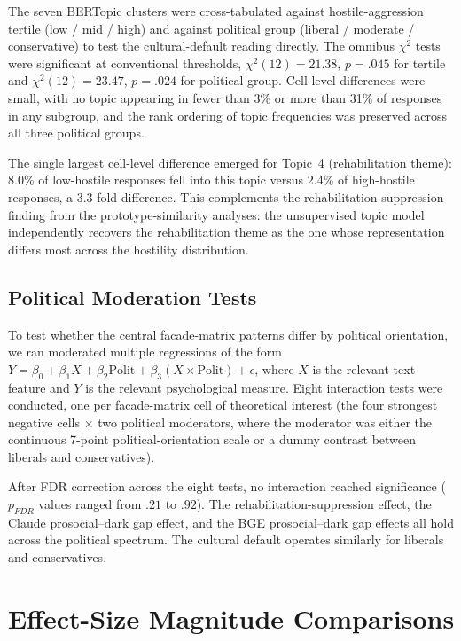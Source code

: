 The seven BERTopic clusters were cross-tabulated against hostile-aggression tertile (low / mid / high) and against political group (liberal / moderate / conservative) to test the cultural-default reading directly. The omnibus $\chi^2$ tests were significant at conventional thresholds, $\chi^2(12) = 21.38$, $p = .045$ for tertile and $\chi^2(12) = 23.47$, $p = .024$ for political group. Cell-level differences were small, with no topic appearing in fewer than 3\% or more than 31\% of responses in any subgroup, and the rank ordering of topic frequencies was preserved across all three political groups.

The single largest cell-level difference emerged for Topic~4 (rehabilitation theme): 8.0\% of low-hostile responses fell into this topic versus 2.4\% of high-hostile responses, a 3.3-fold difference. This complements the rehabilitation-suppression finding from the prototype-similarity analyses: the unsupervised topic model independently recovers the rehabilitation theme as the one whose representation differs most across the hostility distribution.

\subsection{Political Moderation Tests}
\label{sec:supp_political_mod}

To test whether the central facade-matrix patterns differ by political orientation, we ran moderated multiple regressions of the form $Y = \beta_0 + \beta_1 X + \beta_2 \text{Polit} + \beta_3 (X \times \text{Polit}) + \epsilon$, where $X$ is the relevant text feature and $Y$ is the relevant psychological measure. Eight interaction tests were conducted, one per facade-matrix cell of theoretical interest (the four strongest negative cells $\times$ two political moderators, where the moderator was either the continuous 7-point political-orientation scale or a dummy contrast between liberals and conservatives).

After FDR correction across the eight tests, no interaction reached significance ($p_\textit{FDR}$ values ranged from $.21$ to $.92$). The rehabilitation-suppression effect, the Claude prosocial--dark gap effect, and the BGE prosocial--dark gap effects all hold across the political spectrum. The cultural default operates similarly for liberals and conservatives.

\section{Effect-Size Magnitude Comparisons}
\label{sec:supp_effect_sizes}

